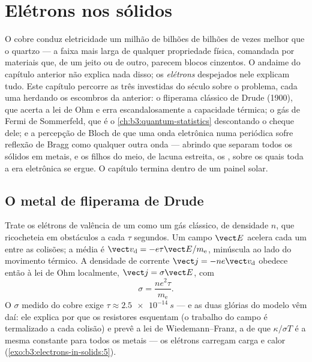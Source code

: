 \chapter{Elétrons nos sólidos}\label{ch:b3:electrons-in-solids}


O cobre conduz eletricidade um milhão de bilhões de bilhões de vezes
melhor que o quartzo --- a faixa mais larga de qualquer propriedade
física, comandada por materiais que, de um jeito ou de outro, parecem
blocos cinzentos. O andaime do capítulo anterior não explica nada disso;
os \emph{elétrons} despejados nele explicam tudo. Este capítulo percorre
as três investidas do século sobre o problema, cada uma herdando os
escombros da anterior: o fliperama clássico de Drude (1900), que acerta
a lei de Ohm e erra escandalosamente a capacidade térmica; o gás de
Fermi de Sommerfeld, que é o \cref{ch:b3:quantum-statistics}
descontando o cheque dele; e a percepção de Bloch de que uma onda
eletrônica numa  periódica sofre reflexão de Bragg
como qualquer outra onda --- abrindo \emph{} que
separam todos os sólidos em metais,  e os filhos do meio, de
lacuna estreita, os , sobre os quais toda a era eletrônica
se ergue. O capítulo termina dentro de um painel solar.

\section{O metal de fliperama de Drude}

\begin{proposition}\label{prop:b3:electrons-in-solids:drude}
Trate os elétrons de valência de um  como um gás clássico, de
densidade $n$, que ricocheteia em obstáculos a cada $\tau$ segundos. Um
campo $\vect E$ acelera cada um entre as colisões; a \emph{} média é $\vect v_{\text{d}} = -e\tau\vect E/m_{\text{e}}$,
minúscula ao lado do movimento térmico. A densidade de corrente $\vect j =
-ne\vect v_{\text{d}}$ obedece então à lei de Ohm localmente,
$\vect j = \sigma\vect E$, com
\[
\sigma = \frac{ne^2\tau}{m_{\text{e}}} .
\]
O $\sigma$ medido do cobre exige $\tau \approx \qty{2.5e-14}{s}$
--- e as duas glórias do modelo vêm daí: ele explica por que os
resistores esquentam (o trabalho do campo é termalizado a cada colisão)
e prevê a lei de Wiedemann--Franz, a de que $\kappa/\sigma T$ é a
mesma constante para todos os metais --- os elétrons carregam carga e
calor (\cref{exo:b3:electrons-in-solids:5}).
\end{proposition}

